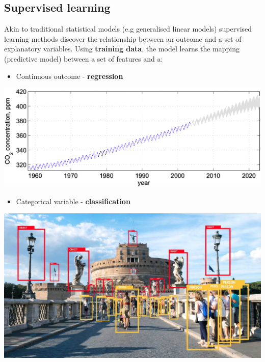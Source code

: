 \documentclass[]{book}
\providecommand{\tightlist}{%
  \setlength{\itemsep}{0pt}\setlength{\parskip}{0pt}}
\begin{document}
\hypertarget{supervised-learning}{%
\subsection*{Supervised learning}\label{supervised-learning}}

Akin to traditional statistical models (e.g generalised linear models) supervised learning methods
discover the relationship between an outcome and a set of explanatory variables.
Using \textbf{training data}, the model learns the mapping (predictive model) between a set of features
and a:

\begin{itemize}
\tightlist
\item
  Continuous outcome - \textbf{regression}
\end{itemize}

\begin{center}\includegraphics[width=600px]{_img//01-regression} \end{center}

\begin{itemize}
\tightlist
\item
  Categorical variable - \textbf{classification}
\end{itemize}

\begin{center}\includegraphics[width=600px]{_img//01-classification} \end{center}
\end{document}
